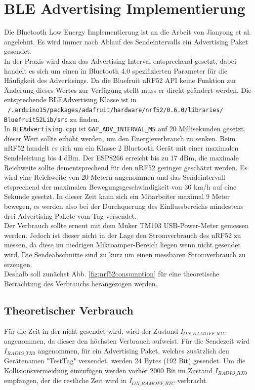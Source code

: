 \section{BLE Advertising Implementierung}
\label{ch:phase3:sec:advertising}
Die Bluetooth Low Energy Implementierung ist an die Arbeit von Jianyong et al. angelehnt.
Es wird immer nach Ablauf des Sendeintervalls ein Advertising Paket gesendet.\\
In der Praxis wird dazu das Advertising Interval entsprechend gesetzt, dabei handelt es sich um einen in Bluetooth 4.0 spezifizierten Parameter für die Häufigkeit des Advertisings.
Da die Bluefruit nRF52 API keine Funktion zur Änderung dieses Wertes zur Verfügung stellt muss er direkt geändert werden.
Die entsprechende BLEAdvertising Klasse ist in \\\texttt{~/.arduino15/packages/adafruit/hardware/nrf52/0.6.0/libraries/}\\\texttt{Bluefruit52Lib/src} zu finden. \\
In \texttt{BLEAdvertising.cpp} ist \texttt{GAP\_ADV\_INTERVAL\_MS} auf 20 Millisekunden gesetzt, dieser Wert sollte erhöht werden, um den Energieverbrauch zu senken.
Beim nRF52 handelt es sich um ein Klasse 2 Bluetooth Gerät mit einer maximalen Sendeleistung bis 4 dBm.
Der ESP8266 erreicht bis zu 17 dBm, die maximale Reichweite sollte dementsprechend für den nRF52 geringer geschätzt werden.
Es wird eine Reichweite von 20 Metern angenommen und das Sendeintervall etsprechend der maximalen Bewegungsgeschwindigkeit von 30 km/h auf eine Sekunde gesetzt. 
In dieser Zeit kann sich ein Mitarbeiter maximal 9 Meter bewegen, es werden also bei der Durchquerung des Einflussbereichs mindestens drei Advertising Pakete vom Tag versendet.\\
Der Verbrauch sollte erneut mit dem Muker TM103 USB-Power-Meter gemessen werden.
Jedoch ist dieser nicht in der Lage den Stromverbrauch des nRF52 zu messen, da diese im niedrigen Mikroamper-Bereich liegen wenn nicht gesendet wird.
Die Sendeabschnitte sind zu kurz um einen messbaren Stromverbrauch zu erzeugen.\\
Deshalb soll zunächst Abb. \ref{fig:nrf52consumption} für eine theoretische Betrachtung des Verbrauchs herangezogen werden. 

\subsection{Theoretischer Verbrauch}
Für die Zeit in der nicht gesendet wird, wird der Zustand $I_{ON\_RAMOFF\_RTC}$ angenommen, da dieser den höchsten Verbrauch aufweist.
Für die Sendezeit wird $I_{RADIO\_TX0}$ angenommen, für ein Advertising Paket, welches zusätzlich den Gerätenamen "TestTag" versendet, werden 24 Bytes (192 Bit) gesendet.
Um die Kollisionsvermeidung einzufügen werden vorher 2000 Bit im Zustand $I_{RADIO\_RX0}$ empfangen, der die restliche Zeit wird in $I_{ON\_RAMOFF\_RTC}$ verbracht. \\[1cm]

